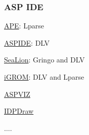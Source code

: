 \begin{frame}
  \frametitle{ASP IDE}
  \begin{itemize}{\color{blue}
    \item \href{http://opus.bath.ac.uk/25392/}{APE}: Lparse
    \item \href{https://www.mat.unical.it/ricca/aspide/}{ASPIDE}: DLV
    \item \href{http://arxiv.org/abs/1109.3989}{SeaLion}: Gringo and DLV
    \item \href{http://igrom.sourceforge.net/index.php?url=page/index/user-guide}{iGROM}: DLV and Lparse
    \item \href{http://opus.bath.ac.uk/12628/}{ASPVIZ}
    \item \href{https://dtai.cs.kuleuven.be/krr/software/visualisation}{IDPDraw}}
    \item $\ldots$.
  \end{itemize}
\end{frame}
%
%
